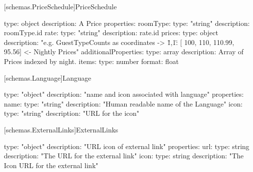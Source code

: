 [schemas.PriceSchedule]{PriceSchedule}
\begin{codeblock}
  type: object
  description: A Price
  properties:
    roomType:
      type: "string"
      description: roomType.id
    rate:
      type: "string"
      description: rate.id
    prices:
      type: object
      description: "e.g. GuestTypeCounts as coordinates -> { \"1,1\" : [ 100, 110, 110.99, 95.56] } <- Nightly Prices"
      additionalProperties:
          type: array
          description: Array of Prices indexed by night.
          items:
             type: number
             format: float
\end{codeblock}

[schemas.Language]{Language}
\begin{codeblock}
  type: "object"
  description: "name and icon associated with language"
  properties:
    name:
      type: "string"
      description: "Human readable name of the Language"
    icon:
      type: "string"
      description: "URL for the icon"
\end{codeblock}

[schemas.ExternalLinks]{ExternalLinks}
\begin{codeblock}
  type: "object"
  description: "URL icon of external link"
  properties:
    url:
      type: string
      description: "The URL for the external link"
    icon:
      type: string
      description: "The Icon URL for the external link"
\end{codeblock}


